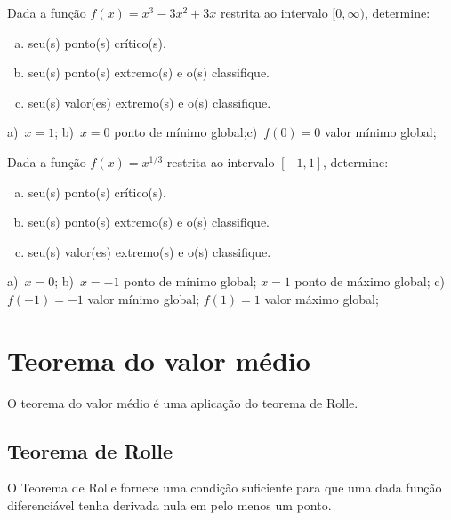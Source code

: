 \begin{exer}
  Dada a função $f(x)=x^{3} - 3 x^{2} + 3 x$ restrita ao intervalo $[0, \infty)$, determine:
  \begin{enumerate}[a)]
  \item seu(s) ponto(s) crítico(s).
  \item seu(s) ponto(s) extremo(s) e o(s) classifique.
  \item seu(s) valor(es) extremo(s) e o(s) classifique.
  \end{enumerate}
\end{exer}
\begin{resp}
  a)~$x=1$; b)~$x=0$ ponto de mínimo global;c)~$f(0)=0$ valor mínimo global;
\end{resp}

\begin{exer}
  Dada a função $f(x)=x^{1/3}$ restrita ao intervalo $[-1,1]$, determine:
  \begin{enumerate}[a)]
  \item seu(s) ponto(s) crítico(s).
  \item seu(s) ponto(s) extremo(s) e o(s) classifique.
  \item seu(s) valor(es) extremo(s) e o(s) classifique.
  \end{enumerate}
\end{exer}
\begin{resp}
  a)~$x=0$; b)~$x=-1$ ponto de mínimo global; $x=1$ ponto de máximo global; c)~$f(-1)=-1$ valor mínimo global; $f(1)=1$ valor máximo global;
\end{resp}


\section{Teorema do valor médio}\label{cap_apderiv_sec_valormedio}

O teorema do valor médio é uma aplicação do teorema de Rolle.

\subsection{Teorema de Rolle}

O Teorema de Rolle fornece uma condição suficiente para que uma dada função diferenciável tenha derivada nula em pelo menos um ponto.

